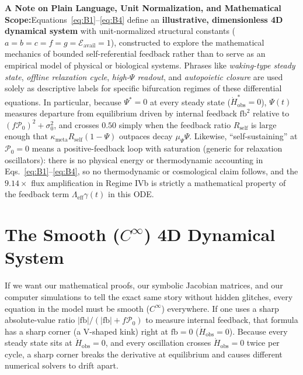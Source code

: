 \documentclass[11pt,a4paper]{article}
\newcommand{\takeaway}[2]{%
  \vspace{6pt}\noindent\colorbox{primary!8}{%
    \parbox{\dimexpr\textwidth-2\fboxsep\relax}{%
      \vspace{4pt}\textbf{\color{primary}#1:}\hspace{0.5em}#2\vspace{4pt}%
    }%
  }\vspace{6pt}%
}
\theoremstyle{definition}
\begin{document}
\takeaway{A Note on Plain Language, Unit Normalization, and Mathematical Scope}{Equations~\eqref{eq:B1}--\eqref{eq:B4} define an \textbf{illustrative, dimensionless 4D dynamical system} with unit-normalized structural constants ($a=b=c=f=g=\mathcal{E}_{\mathrm{avail}}=1$), constructed to explore the mathematical mechanics of bounded self-referential feedback rather than to serve as an empirical model of physical or biological systems. Phrases like \emph{waking-type steady state}, \emph{offline relaxation cycle}, \emph{high-$\Psi$ readout}, and \emph{autopoietic closure} are used solely as descriptive labels for specific bifurcation regimes of these differential equations. In particular, because $\Psi^* = 0$ at every steady state ($\dot{H}_{\mathrm{obs}}^* = 0$), $\Psi(t)$ measures departure from equilibrium driven by internal feedback $\mathrm{fb}^2$ relative to $(f\mathcal{P}_0)^2 + \sigma_0^2$, and crosses $0.50$ simply when the feedback ratio $R_{\mathrm{self}}$ is large enough that $\kappa_{\mathrm{meta}}R_{\mathrm{self}}(1-\Psi)$ outpaces decay $\mu_\Psi\Psi$. Likewise, ``self-sustaining'' at $\mathcal{P}_0 = 0$ means a positive-feedback loop with saturation (generic for relaxation oscillators): there is no physical energy or thermodynamic accounting in Eqs.~\eqref{eq:B1}--\eqref{eq:B4}, so no thermodynamic or cosmological claim follows, and the $9.14\times$ flux amplification in Regime IVb is strictly a mathematical property of the feedback term $\Lambda_{\mathrm{eff}}\gamma(t)$ in this ODE.}

\section{The Smooth \texorpdfstring{($C^\infty$)}{(C-infinity)} 4D Dynamical System}
\label{sec:formulation}

If we want our mathematical proofs, our symbolic Jacobian matrices, and our computer simulations to tell the exact same story without hidden glitches, every equation in the model must be smooth ($C^\infty$) everywhere. If one uses a sharp absolute-value ratio $|\mathrm{fb}|/(|\mathrm{fb}| + f\mathcal{P}_0)$ to measure internal feedback, that formula has a sharp corner (a V-shaped kink) right at $\mathrm{fb} = 0$ ($\dot{H}_{\mathrm{obs}} = 0$). Because every steady state sits at $\dot{H}_{\mathrm{obs}} = 0$, and every oscillation crosses $\dot{H}_{\mathrm{obs}} = 0$ twice per cycle, a sharp corner breaks the derivative at equilibrium and causes different numerical solvers to drift apart.
\end{document}
